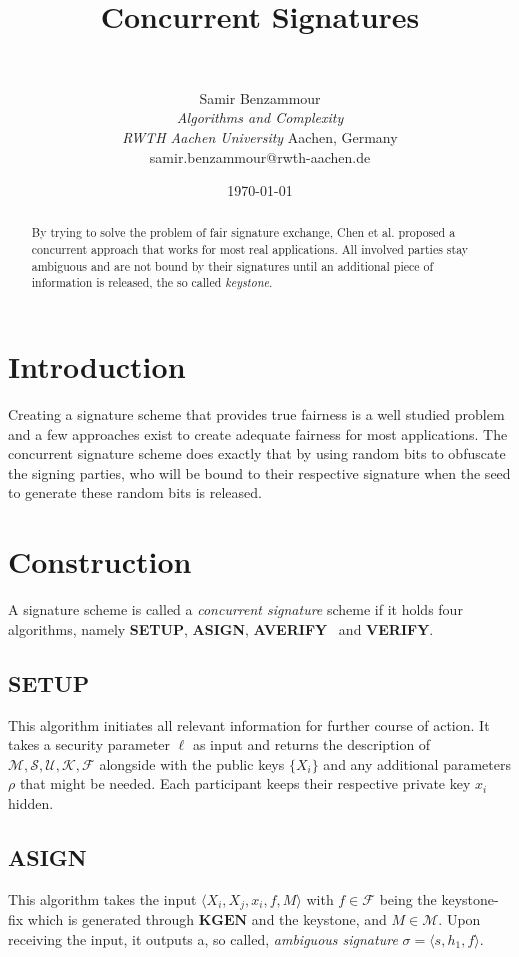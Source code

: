 \documentclass[final]{IEEEtran}%
\title{Concurrent Signatures}
\author{\IEEEauthorblockN{Samir Benzammour}\\
    \IEEEauthorblockA{\textit{Algorithms and Complexity} \\
    \textit{RWTH Aachen University}\\
    Aachen, Germany \\
    samir.benzammour@rwth-aachen.de}
  }
\author{Samir Benzammour\\
    \textit{Algorithms and Complexity}\\
    \textit{RWTH Aachen University}
    Aachen, Germany \\
    samir.benzammour@rwth-aachen.de
  }
\date{\today}
\newcommand{\goedel}[1]{\langle #1 \rangle}
\newcommand{\mespace}{\mathcal{M}}
\newcommand{\sspace}{\mathcal{S}}
\newcommand{\uspace}{\mathcal{U}}
\newcommand{\kspace}{\mathcal{K}}
\newcommand{\kfspace}{\mathcal{F}}
\begin{document}
\maketitle

\begin{abstract}
  By trying to solve the problem of fair signature exchange, Chen et al. proposed a concurrent approach that works for most real applications. 
  All involved parties stay ambiguous and are not bound by their signatures until an additional piece of information is released, the so called \textit{keystone}.
\end{abstract}

\section{Introduction}
Creating a signature scheme that provides true fairness is a well studied problem and a few approaches exist to create adequate fairness for most applications.
The concurrent signature scheme does exactly that by using random bits to obfuscate the signing parties, who will be bound to their respective signature when the seed to generate these random bits is released.

\section{Construction}
  A signature scheme is called a \textit{concurrent signature} scheme if it holds four algorithms, namely \textbf{SETUP}, \textbf{ASIGN}, \textbf{AVERIFY}~ and \textbf{VERIFY}.
   
  \subsection{\textbf{SETUP}}
    This algorithm initiates all relevant information for further course of action.
    It takes a security parameter \(\ell\) as input and returns the description of \(\mespace, \sspace, \uspace, \kspace, \kfspace\) alongside with the public keys \(\{X_i\}\) and any additional parameters \(\rho\) that might be needed.
    Each participant keeps their respective private key \(x_i\) hidden. 

  \subsection{\textbf{ASIGN}}
    This algorithm takes the input \(\goedel{X_i, X_j, x_i, f, M}\) with \(f\in\kfspace\) being the keystone-fix which is generated through \(\textbf{KGEN}\) and the keystone, and \(M\in\mespace\).
    Upon receiving the input, it outputs a, so called, \textit{ambiguous signature} \(\sigma=\goedel{s, h_1, f}\).
\end{document}
